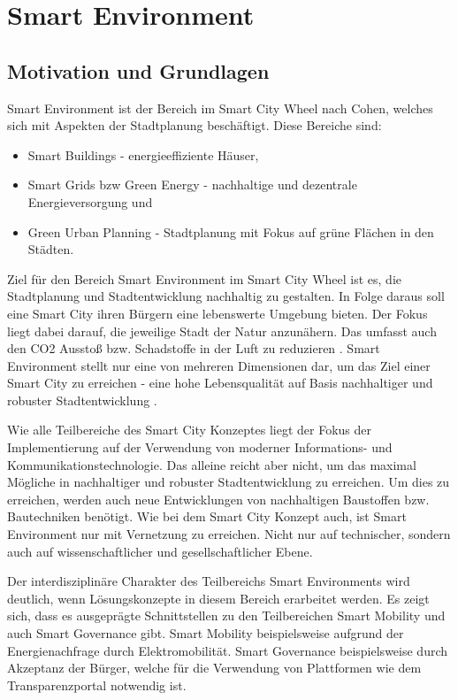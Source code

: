 \section{Smart Environment}
\label{sec:smart_environment}

\subsection{Motivation und Grundlagen}
Smart Environment ist der Bereich im Smart City Wheel nach Cohen, welches sich mit Aspekten der Stadtplanung beschäftigt.
Diese Bereiche sind:
\begin{itemize}
	\item Smart Buildings - energieeffiziente Häuser,
	\item Smart Grids bzw Green Energy - nachhaltige und dezentrale Energieversorgung und
	\item Green Urban Planning - Stadtplanung mit Fokus auf grüne Flächen in den Städten.
\end{itemize}

Ziel für den Bereich Smart Environment im Smart City Wheel ist es, die Stadtplanung und Stadtentwicklung nachhaltig zu gestalten.
In Folge daraus soll eine Smart City ihren Bürgern eine lebenswerte Umgebung bieten.
Der Fokus liegt dabei  darauf, die jeweilige Stadt der Natur anzunähern.
Das umfasst auch den CO2 Ausstoß bzw. Schadstoffe in der Luft zu reduzieren \autocite[vgl.][S. 4]{Monzon.2015}.
Smart Environment stellt nur eine von mehreren Dimensionen dar, um das Ziel einer Smart City zu erreichen - eine hohe Lebensqualität auf Basis nachhaltiger und robuster Stadtentwicklung \autocite[vgl.][S. 3]{Monzon.2015}.

Wie alle Teilbereiche des Smart City Konzeptes liegt der Fokus der Implementierung auf der Verwendung von moderner Informations- und Kommunikationstechnologie.
Das alleine reicht aber nicht, um das maximal Mögliche in nachhaltiger und robuster Stadtentwicklung zu erreichen.
Um dies zu erreichen, werden auch neue Entwicklungen von nachhaltigen Baustoffen bzw. Bautechniken benötigt.
Wie bei dem Smart City Konzept auch, ist Smart Environment nur mit Vernetzung zu erreichen.
Nicht nur auf technischer, sondern auch auf wissenschaftlicher und gesellschaftlicher Ebene.

Der interdisziplinäre Charakter des Teilbereichs Smart Environments wird deutlich, wenn Lösungskonzepte in diesem Bereich erarbeitet werden.
Es zeigt sich, dass es ausgeprägte Schnittstellen zu den Teilbereichen Smart Mobility und auch Smart Governance gibt.
Smart Mobility beispielsweise aufgrund der Energienachfrage durch Elektromobilität.
Smart Governance beispielsweise durch Akzeptanz der Bürger, welche für die Verwendung von Plattformen wie dem Transparenzportal notwendig ist.

